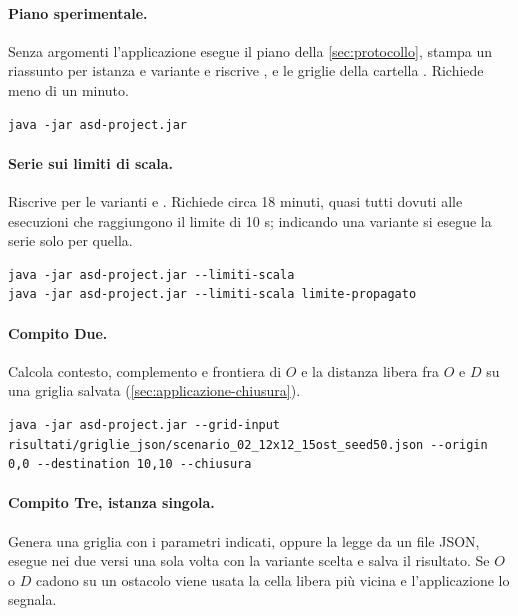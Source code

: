 \paragraph{Piano sperimentale.} Senza argomenti l'applicazione esegue il
piano della \cref{sec:protocollo}, stampa un riassunto per istanza e
variante e riscrive ,  e le griglie
della cartella . Richiede meno di un minuto.

\begin{lstlisting}
java -jar asd-project.jar
\end{lstlisting}

\paragraph{Serie sui limiti di scala.} Riscrive
 per le varianti  e
. Richiede circa 18 minuti, quasi tutti dovuti alle
esecuzioni che raggiungono il limite di 10 s; indicando una variante si
esegue la serie solo per quella.

\begin{lstlisting}
java -jar asd-project.jar --limiti-scala
java -jar asd-project.jar --limiti-scala limite-propagato
\end{lstlisting}

\paragraph{Compito Due.} Calcola contesto, complemento e frontiera di $O$ e
la distanza libera fra $O$ e $D$ su una griglia salvata
(\cref{sec:applicazione-chiusura}).

\begin{lstlisting}
java -jar asd-project.jar --grid-input risultati/griglie_json/scenario_02_12x12_15ost_seed50.json --origin 0,0 --destination 10,10 --chiusura
\end{lstlisting}

\paragraph{Compito Tre, istanza singola.} Genera una griglia con i
parametri indicati, oppure la legge da un file JSON, esegue \cmin{} nei due
versi una sola volta con la variante scelta e salva il risultato. Se $O$ o
$D$ cadono su un ostacolo viene usata la cella libera più vicina e
l'applicazione lo segnala.

